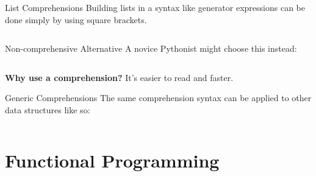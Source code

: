\documentclass{lug}
\begin{document}
\begin{frame}{List Comprehensions}
    Building lists in a syntax like generator expressions can be done simply by
    using square brackets.
    \medskip

    \inputminted{python3}{examples/generator_basic_lc.py}

    \pause

    \medskip

    \begin{block}{Non-comprehensive Alternative}
        A novice Pythonist might choose this instead:

        \smallskip

        \begin{minipage}{\linewidth}
        \inputminted{python3}{examples/generator_basic_lc_disgusting.py}
        \end{minipage}

        \smallskip

        \textbf{Why use a comprehension?} It's easier to read and faster.
    \end{block}

\end{frame}

\begin{frame}{Generic Comprehensions}
    The same comprehension syntax can be applied to other data structures like
    so:
    \inputminted{python3}{examples/generic_comprehensions.py}
\end{frame}

\section{Functional Programming}
\end{document}
